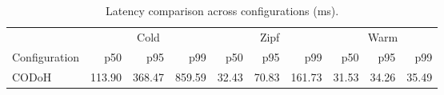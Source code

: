 \begin{table}[t]
\centering
\caption{Latency comparison across configurations (ms).}
\label{tab:comparison}
\small
\begin{tabular}{l rrr rrr rrr}
\toprule
 & \multicolumn{3}{c}{Cold} & \multicolumn{3}{c}{Zipf} & \multicolumn{3}{c}{Warm} \\
\cmidrule(lr){2-4} \cmidrule(lr){5-7} \cmidrule(lr){8-10}
Configuration & p50 & p95 & p99 & p50 & p95 & p99 & p50 & p95 & p99 \\
\midrule
CODoH & 113.90 & 368.47 & 859.59 & 32.43 & 70.83 & 161.73 & 31.53 & 34.26 & 35.49 \\
\bottomrule
\end{tabular}
\end{table}
